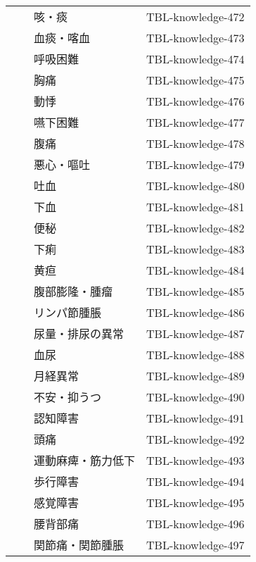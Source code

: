 \begin{xltabular}{\linewidth}{XXXX}
 &  & 咳・痰 & TBL-knowledge-472 \\
 &  & 血痰・喀血 & TBL-knowledge-473 \\
 &  & 呼吸困難 & TBL-knowledge-474 \\
 &  & 胸痛 & TBL-knowledge-475 \\
 &  & 動悸 & TBL-knowledge-476 \\
 &  & 嚥下困難 & TBL-knowledge-477 \\
 &  & 腹痛 & TBL-knowledge-478 \\
 &  & 悪心・嘔吐 & TBL-knowledge-479 \\
 &  & 吐血 & TBL-knowledge-480 \\
 &  & 下血 & TBL-knowledge-481 \\
 &  & 便秘 & TBL-knowledge-482 \\
 &  & 下痢 & TBL-knowledge-483 \\
 &  & 黄疸 & TBL-knowledge-484 \\
 &  & 腹部膨隆・腫瘤 & TBL-knowledge-485 \\
 &  & リンパ節腫脹 & TBL-knowledge-486 \\
 &  & 尿量・排尿の異常 & TBL-knowledge-487 \\
 &  & 血尿 & TBL-knowledge-488 \\
 &  & 月経異常 & TBL-knowledge-489 \\
 &  & 不安・抑うつ & TBL-knowledge-490 \\
 &  & 認知障害 & TBL-knowledge-491 \\
 &  & 頭痛 & TBL-knowledge-492 \\
 &  & 運動麻痺・筋力低下 & TBL-knowledge-493 \\
 &  & 歩行障害 & TBL-knowledge-494 \\
 &  & 感覚障害 & TBL-knowledge-495 \\
 &  & 腰背部痛 & TBL-knowledge-496 \\
 &  & 関節痛・関節腫脹 & TBL-knowledge-497 \\
\bottomrule
\end{xltabular}

